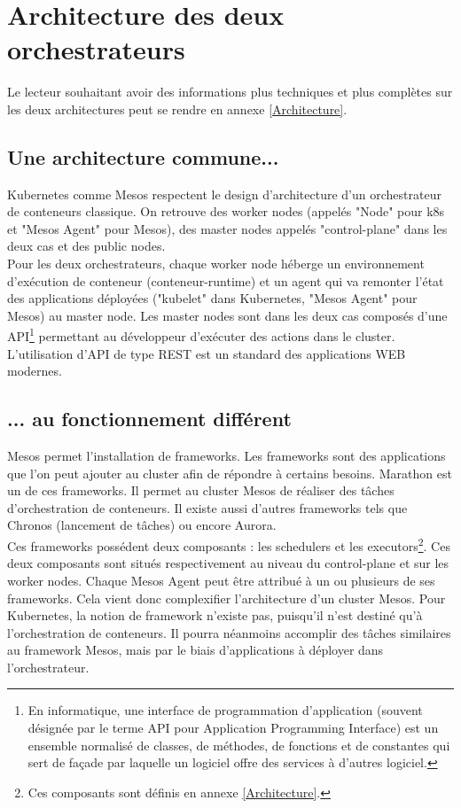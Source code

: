 \documentclass[11pt,fleqn]{book} %
\begin{document}
\section{Architecture des deux orchestrateurs}
Le lecteur souhaitant avoir des informations plus techniques et plus complètes sur les deux architectures peut se rendre en annexe \ref{Architecture}.
\subsection{Une architecture commune...}
Kubernetes comme Mesos respectent le design d'architecture d'un orchestrateur de conteneurs classique. On retrouve des worker nodes (appelés "Node" pour k8s et "Mesos Agent" pour Mesos), des master nodes appelés "control-plane" dans les deux cas et des public nodes.\\

Pour les deux orchestrateurs, chaque worker node héberge un environnement d'exécution de conteneur (conteneur-runtime) et un agent qui va remonter l'état des applications déployées ("kubelet" dans Kubernetes, "Mesos Agent" pour Mesos) au master node. Les master nodes sont dans les deux cas composés d'une API\footnote{En informatique, une interface de programmation d’application (souvent désignée par le terme API pour Application Programming Interface) est un ensemble normalisé de classes, de méthodes, de fonctions et de constantes qui sert de façade par laquelle un logiciel offre des services à d'autres logiciel.} permettant au développeur d'exécuter des actions dans le cluster. L'utilisation d'API de type REST est un standard des applications WEB modernes.

\subsection{... au fonctionnement différent}
Mesos permet l'installation de frameworks. Les frameworks sont des applications que l'on peut ajouter au cluster afin de répondre à certains besoins. Marathon est un de ces frameworks. Il permet au cluster Mesos de réaliser des tâches d'orchestration de conteneurs. Il existe aussi d'autres frameworks tels que Chronos (lancement de tâches) ou encore Aurora.\\

Ces frameworks possédent deux composants : les schedulers et les executors\footnote{Ces composants sont définis en annexe \ref{Architecture}.}. Ces deux composants sont situés respectivement au niveau du control-plane et sur les worker nodes. Chaque Mesos Agent peut être attribué à un ou plusieurs de ses frameworks. Cela vient donc complexifier l'architecture d'un cluster Mesos. Pour Kubernetes, la notion de framework n'existe pas, puisqu'il n'est destiné qu'à l'orchestration de conteneurs. Il pourra néanmoins accomplir des tâches similaires au framework Mesos, mais par le biais d'applications à déployer dans l'orchestrateur. \\
\end{document}
